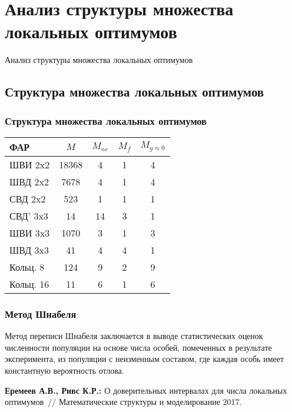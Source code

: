 \section{Анализ структуры множества локальных оптимумов}
\begin{frame}
    \begin{center}
        \Huge
        Анализ структуры множества локальных оптимумов
    \end{center}
\end{frame}



\subsection{Структура множества локальных оптимумов}

\begin{frame}
    \frametitle{Структура множества локальных оптимумов}
    \begin{table}[!h]
    \centering
    \begin{tabular}{|l | c | c | c | c |}
        \hline
        \textbf{ФАР} & \textbf{$M$} & \textbf{$M_{ne}$} & \textbf{$M_{f}$} & \textbf{$M_{y\approx0}$}\\
        \hline
        ШВИ 2x2 & 18368 & 4 & 1 & 4\\
        ШВД 2x2 & 7678  & 4 & 1 & 4\\
        СВД 2x2  & 523  & 1 & 1 & 1\\
        СВД' 3x3  & 14  & 14 & 3 & 1\\
        ШВИ 3x3 & 1070  & 3 & 1 & 3\\
        ШВД 3x3 & 41  & 4 & 4 & 1\\
        Кольц. 8 & 124  & 9 & 2 & 9\\
        Кольц. 16 & 11  & 6 & 1 & 6\\
        \hline
    \end{tabular}
    \label{tab:structure}
\end{table}
\end{frame}


\begin{frame}
    \frametitle{Метод Шнабеля}
    Метод переписи Шнабеля заключается в выводе статистических оценок численности популяции на основе числа особей, помеченных в результате эксперимента, из популяции с неизменным составом, где каждая особь имеет константную вероятность отлова.

    \vspace{4em}

    \textbf{Еремеев А.В., Ривс К.Р.:} О доверительных интервалах для числа локальных оптимумов~// Математические структуры и моделирование 2017.
\end{frame}

